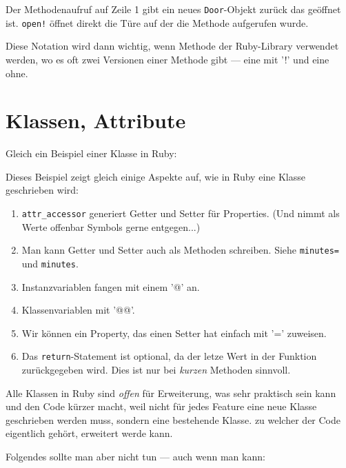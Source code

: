 \documentclass[a4book,11pt,twoside]{scrbook}
\begin{document}


Der Methodenaufruf auf Zeile 1 gibt ein neues \texttt{Door}-Objekt zurück das geöffnet ist. \texttt{open!} öffnet direkt die Türe auf der die Methode aufgerufen wurde.

Diese Notation wird dann wichtig, wenn Methode der Ruby-Library verwendet werden, wo es oft zwei Versionen einer Methode gibt — eine mit '!' und eine ohne.







\section{Klassen, Attribute} %
\label{sec:klassen_methoden_attribute}
Gleich ein Beispiel einer Klasse in Ruby:



Dieses Beispiel zeigt gleich einige Aspekte auf, wie in Ruby eine Klasse geschrieben wird:

\begin{enumerate}
	\item \texttt{attr\_accessor} generiert Getter und Setter für Properties. (Und nimmt als Werte offenbar Symbols gerne entgegen...)
	\item Man kann Getter und Setter auch als Methoden schreiben. Siehe \texttt{minutes=} und \texttt{minutes}.
	\item Instanzvariablen fangen mit einem '@' an.
	\item Klassenvariablen mit '@@'.
	\item Wir können ein Property, das einen Setter hat einfach mit '=' zuweisen.
	\item Das \texttt{return}-Statement ist optional, da der letze Wert in der Funktion zurückgegeben wird. Dies ist nur bei \emph{kurzen} Methoden sinnvoll.
\end{enumerate}

Alle Klassen in Ruby sind \emph{offen} für Erweiterung, was sehr praktisch sein kann und den Code kürzer macht, weil nicht für jedes Feature eine neue Klasse geschrieben werden muss, sondern eine bestehende Klasse. zu welcher der Code eigentlich gehört, erweitert werde kann.



Folgendes sollte man aber nicht tun — auch wenn man kann:


\end{document}
